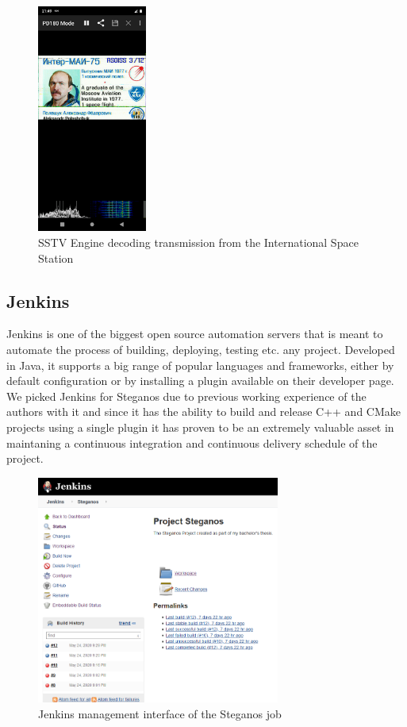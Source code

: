 \begin{multicols}{2}
\begin{figure}[H]
    \centering
    \includegraphics[height=7.5cm,keepaspectratio]{pics/application_chapter/sstv_example_iss}
    \caption{SSTV Engine decoding transmission from the International Space Station}
\end{figure}

\subsection{Jenkins}
Jenkins is one of the biggest open source automation servers that is meant to automate the process of building, deploying, testing etc. any project. Developed in Java, it supports a big range of popular languages and frameworks, either by default configuration or by installing a plugin available on their developer page. We picked Jenkins for Steganos due to previous working experience of the authors with it and since it has the ability to build and release C++ and CMake projects using a single plugin it has proven to be an extremely valuable asset in maintaning a continuous integration and continuous delivery schedule of the project.

\begin{figure}[H]
    \centering
    \includegraphics[height=7.5cm,keepaspectratio]{pics/application_chapter/steganos_jenkins_job}
    \caption{Jenkins management interface of the Steganos job}
\end{figure}



\end{multicols}
